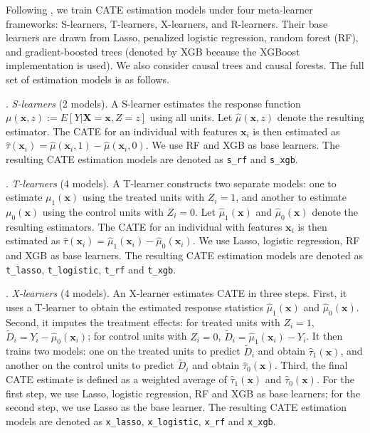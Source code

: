 \documentclass[12pt]{article}
\begin{document}
Following \cite{dwivedi2020}, we train CATE estimation models under four meta-learner frameworks: S-learners, T-learners, X-learners, and R-learners. Their base learners are drawn from Lasso, penalized logistic regression, random forest (RF), and gradient-boosted trees (denoted by XGB because the XGBoost implementation is used). We also consider causal trees and causal forests. The full set of estimation models is as follows.

\vspace{0.3cm}

. {\it S-learners} (2 models). A S-learner \citep{kunzel2019} estimates the response function $\mu(\bm{x},z):=E[Y|\bm{X}=\bm{x},Z=z]$ using all units. Let $\widehat{\mu}(\bm{x},z)$ denote the resulting estimator. The CATE for an individual with features $\bm{x}_i$ is then estimated as $\widehat{\tau}(\bm{x}_i) = \widehat{\mu}(\bm{x}_i,1) - \widehat{\mu}(\bm{x}_i,0)$. We use RF and XGB as base learners. The resulting CATE estimation models are denoted as \texttt{s\_rf} and \texttt{s\_xgb}.

\vspace{0.3cm}

. {\it T-learners} (4 models). A T-learner \citep{kunzel2019} constructs two separate models: one to estimate $\mu_1(\bm{x})$ using the treated units with $Z_i=1$, and another to estimate $\mu_0(\bm{x})$ using the control units with $Z_i=0$. Let $\widehat{\mu}_1(\bm{x})$ and $\widehat{\mu}_0(\bm{x})$ denote the resulting estimators. The CATE for an individual with features $\bm{x}_i$ is then estimated as $\widehat{\tau}(\bm{x}_i) = \widehat{\mu}_1(\bm{x}_i) - \widehat{\mu}_0(\bm{x}_i)$. We use Lasso, logistic regression, RF and XGB as base learners. The resulting CATE estimation models are denoted as \texttt{t\_lasso}, \texttt{t\_logistic}, \texttt{t\_rf} and \texttt{t\_xgb}.

\vspace{0.3cm}

. {\it X-learners} (4 models). An X-learner \citep{kunzel2019} estimates CATE in three steps. First, it uses a T-learner to obtain the estimated response statistics $\widehat{\mu}_1(\bm{x})$ and $\widehat{\mu}_0(\bm{x})$. Second, it imputes the treatment effects: for treated units with $Z_i=1$, $\widetilde{D}_i=Y_i-\widehat{\mu}_0(\bm{x}_i)$; for control units with $Z_i=0$, $\widetilde{D}_i=\widehat{\mu}_1(\bm{x}_i)-Y_i$. It then trains two models: one on the treated units to predict $\widetilde{D}_i$ and obtain $\widehat{\tau}_1(\bm{x})$, and another on the control units to predict $\widetilde{D}_i$ and obtain $\widehat{\tau}_0(\bm{x})$. Third, the final CATE estimate is defined as a weighted average of $\widehat{\tau}_1(\bm{x})$ and $\widehat{\tau}_0(\bm{x})$. For the first step, we use Lasso, logistic regression, RF and XGB as base learners; for the second step, we use Lasso as the base learner. The resulting CATE estimation models are denoted as \texttt{x\_lasso}, \texttt{x\_logistic}, \texttt{x\_rf} and \texttt{x\_xgb}.
\end{document}
